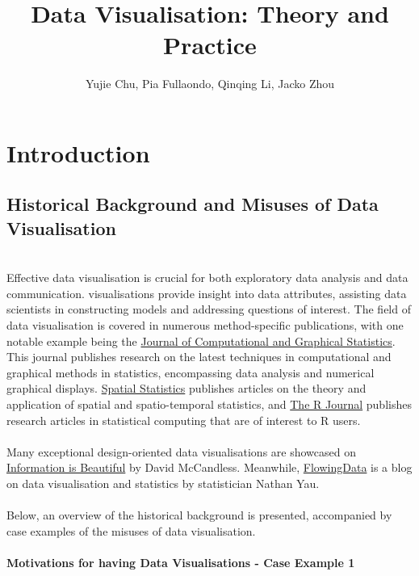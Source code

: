 \documentclass{article}\usepackage[]{graphicx}\usepackage[]{xcolor}
\title{Data Visualisation: Theory and Practice}
\author{Yujie Chu, Pia Fullaondo, Qinqing Li, Jacko Zhou}
\begin{document}
\maketitle 

\newpage
\tableofcontents

\newpage 

\section{Introduction}

\subsection{Historical Background and Misuses of Data Visualisation}
\\Effective data visualisation is crucial for both exploratory data analysis and data communication. visualisations provide insight into data attributes, assisting data scientists in constructing models and addressing questions of interest. The field of data visualisation is covered in numerous method-specific publications, with one notable example being the \href{https://www.tandfonline.com/journals/ucgs20}{Journal of Computational and Graphical Statistics}. This journal publishes research on the latest techniques in computational and graphical methods in statistics, encompassing data analysis and numerical graphical displays. \href{https://www.sciencedirect.com/journal/spatial-statistics}{Spatial Statistics} publishes articles on the theory and application of spatial and spatio-temporal statistics, and \href{https://journal.r-project.org}{The R Journal} publishes research articles in statistical computing that are of interest to R users.
\\  
\\Many exceptional design-oriented data visualisations are showcased on \href{https://informationisbeautiful.net/}{Information is Beautiful} by David McCandless. Meanwhile, \href{https://flowingdata.com/}{FlowingData} is a blog on data visualisation and statistics by statistician Nathan Yau.
\\  
\\Below, an overview of the historical background is presented, accompanied by case examples of the misuses of data visualisation.
\\  
\\\textbf{Motivations for having Data Visualisations - Case Example 1}\\
\end{document}
